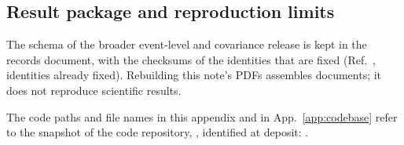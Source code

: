\subsection{Result package and reproduction limits}
\label{app:release}

The schema of the broader event-level and covariance release is kept in the records document, with the checksums of the identities that are fixed (Ref.~\cite{NoteRecords2026}, identities already fixed). Rebuilding this note's PDFs assembles documents; it does not reproduce scientific results.

The code paths and file names in this appendix and in App.~\ref{app:codebase} refer to the snapshot of the code repository, \repolink, identified at deposit: \depositsnapshot.

